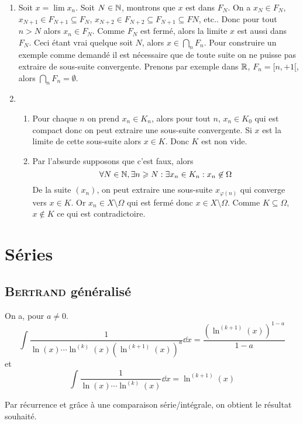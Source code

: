 \begin{enumerate}
    \item Soit $x = \lim x_n$. Soit $N \in \mathbb{N}$, montrons que $x$ est dans $F_N$. On a $x_N \in F_N$,
$x_{N+1} \in F_{N+1} \subseteq F_N$, $x_{N+2} \in F_{N+2} \subseteq F_{N+1} \subseteq FN$, etc.. Donc pour tout $n > N$ alors $x_n \in F_N$. Comme $F_N$ est fermé, alors la limite $x$ est aussi dans $F_N$. Ceci étant vrai quelque soit $N$, alors $x \in \bigcap\limits_n F_n$. Pour construire un exemple comme demandé il est nécessaire que de toute suite on ne puisse pas extraire de sous-suite convergente. Prenons par exemple dans $\mathbb{R}$, $F_n = [n,+1[$,
alors $\bigcap\limits_n F_n = \emptyset$.
    \item 
        \begin{enumerate}
            \item Pour chaque $n$ on prend $x_n \in K_n$, alors pour tout $n$, $x_n \in K_0$ qui est compact donc on peut extraire une sous-suite convergente. Si $x$ est la limite de cette sous-suite alors $x \in K$. Donc $K$ est non vide.
            \item Par l'absurde supposons que c'est faux, alors
                \[
                    \forall N \in \mathbb{N}, \exists n \geqslant N : \exists x_n \in K_n : x_n \not\in \Omega
                \] 
                De la suite $(x_n)$, on peut extraire une sous-suite $x_{\varphi(n)}$ qui converge vers $x \in K$. Or $x_n \in X \setminus \Omega$ qui est fermé donc $x \in X \setminus \Omega$. Comme $K\subseteq \Omega$, $x \not\in K$ ce qui est contradictoire.
    \end{enumerate}     
\end{enumerate}

\section{Séries}

\subsection{\textsc{Bertrand} généralisé}

On a, pour $a\neq 0$.
\[
    \int \frac{1}{\ln(x)\cdots\ln^{(k)}(x)\left(\ln^{(k+1)}(x)\right)^{a}} \dd x = \frac{\left(\ln^{(k+1)}(x)\right)^{1-a}}{1-a}
\]
et
\[
    \int \frac{1}{\ln(x)\cdots\ln^{(k)}(x)} \dd x = \ln^{(k+1)}(x)
\]

Par récurrence et grâce à une comparaison série/intégrale, on obtient le résultat souhaité.

